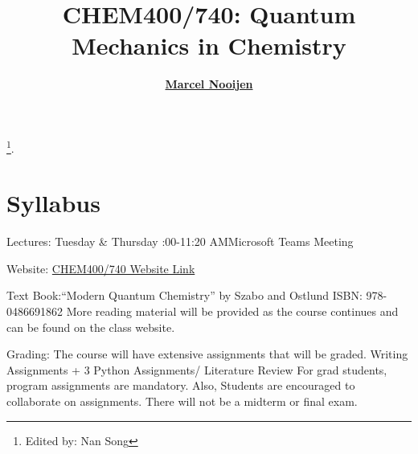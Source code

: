 \documentclass[a4paper, 12pt]{article}
\begin{document}
\title{\bf {CHEM400/740: Quantum Mechanics in Chemistry}} \author{\bf
  \href{http://scienide2.uwaterloo.ca/~nooijen/website_new_20_10_2011/About.html}{Marcel Nooijen}} \date{}
  
\pagestyle{fancy} \fancyhead[L]{\textcolor{PrimaryColor}{CHEM400/740: Quantum Mechanics in Chemistry}} \fancyhead[R]{\textcolor{PrimaryColor}{2021 Winter}}


\maketitle
\tableofcontents

\footnote{\noindent {} \newline
  \updatetext{\today}\newline Edited by: Nan Song}.

\clearpage

\section{Syllabus}
Lectures: \qquad Tuesday \& Thursday :00-11:20 AM\qquad  Microsoft Teams Meeting \newline

\indent Website: \qquad \href{http://scienide2.uwaterloo.ca/~nooijen/website_new_20_10_2011/440F.html}{CHEM400/740 Website Link}\newline

\indent Text Book:\quad   “Modern Quantum Chemistry” by Szabo and Ostlund \newline
\indent \qquad  \qquad \qquad  ISBN: 978-0486691862 \newline
\indent \qquad  \qquad \qquad  More reading material will be provided as the course continues and can be found \indent \qquad  \qquad \qquad  on the class website. \newline

\indent Grading: \qquad The course will have extensive assignments that will be graded.\newline
\indent \qquad  \qquad {} Writing Assignments + 3 Python Assignments/ Literature Review\newline
\indent \qquad  \qquad \qquad For grad students, program assignments are mandatory.\newline
\indent \qquad  \qquad \qquad  Also, Students are encouraged to collaborate on assignments. \newline 
\indent \qquad  \qquad \qquad There will not be a midterm or final exam.
\end{document}
